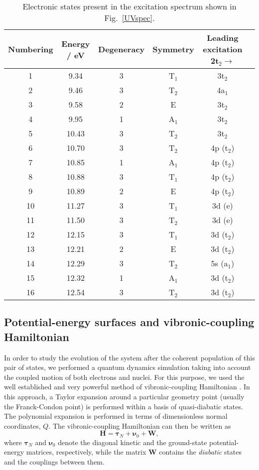\documentclass[12pt]{article}
\begin{document}
\begin{table}
\centering
\caption{\label{Tab_excitation}Electronic states present in the excitation spectrum shown in Fig.~\ref{UVspec}.}
\vspace{0.3cm}
\begin{tabular}{cccccc} 
 \hline \hline
 Numbering & Energy / eV & Degeneracy & Symmetry & Leading excitation 2t$_2\rightarrow$ \\ 
 \hline
 1 & 9.34   & 3 & T$_1$ & 3t$_2$ \\ 
 2 & 9.46   & 3 & T$_2$ & 4a$_1$ \\
 3 & 9.58   & 2 & E     & 3t$_2$ \\
 4 & 9.95   & 1 & A$_1$ & 3t$_2$ \\ 
 5 & 10.43  & 3 & T$_2$ & 3t$_2$ \\
 6 & 10.70  & 3 & T$_2$ & 4p (t$_2$) \\
 7 & 10.85  & 1 & A$_1$ & 4p (t$_2$) \\
 8 & 10.88  & 3 & T$_1$ & 4p (t$_2$) \\
 9 & 10.89  & 2 & E     & 4p (t$_2$) \\
 10 & 11.27 & 3 & T$_1$ & 3d (e) \\
 11 & 11.50 & 3 & T$_2$ & 3d (e) \\
 12 & 12.15 & 3 & T$_1$ & 3d (t$_2$) \\
 13 & 12.21 & 2 & E     & 3d (t$_2$) \\
 14 & 12.29 & 3 & T$_2$ & 5s (a$_1$) \\
 15 & 12.32 & 1 & A$_1$ & 3d (t$_2$) \\
 16 & 12.54 & 3 & T$_2$ & 3d (t$_2$) \\
 \hline
\end{tabular}
\end{table}

\subsection{Potential-energy surfaces and vibronic-coupling Hamiltonian}

In order to study the evolution of the system after the coherent population of this pair of states, we performed a quantum dynamics simulation taking into account the coupled motion of both electrons and nuclei. For this purpose, we used the well established and very powerful method of vibronic-coupling Hamiltonian \cite{koppel1984multimode}. In this approach, a Taylor expansion around a particular geometry point (usually the Franck-Condon point) is performed within a basis of quasi-diabatic states. The polynomial expansion is performed in terms of dimensionless normal coordinates, $Q$. The vibronic-coupling Hamiltonian can then be written as
%
\begin{equation}
\mathbf{H} = \pmb{\tau}_N + \pmb{\nu}_0 + \mathbf{W},
\end{equation}
%
where $\pmb{\tau}_N$ and $\pmb{\nu}_0$ denote the diagonal kinetic and the ground-state potential-energy matrices, respectively, while the matrix $\mathbf{W}$ contains the \textit{diabatic} states and the couplings between them.
\end{document}
